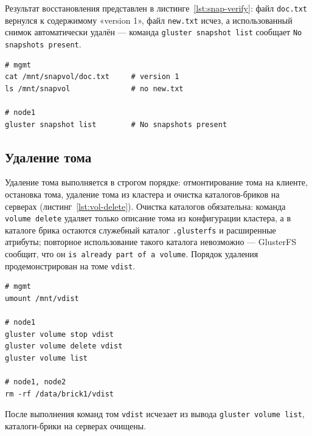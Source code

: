 Результат восстановления представлен в
листинге~\ref{lst:snap-verify}: файл \texttt{doc.txt} вернулся
к содержимому «version 1», файл \texttt{new.txt} исчез,
а использованный снимок автоматически удалён --- команда
\texttt{gluster snapshot list} сообщает \texttt{No snapshots
present}.

\begin{lstlisting}[caption={Проверка результата восстановления (mgmt, node1)}, label={lst:snap-verify}]
# mgmt
cat /mnt/snapvol/doc.txt     # version 1
ls /mnt/snapvol              # no new.txt 

# node1
gluster snapshot list        # No snapshots present
\end{lstlisting}

\subsection{Удаление тома}

Удаление тома выполняется в строгом порядке: отмонтирование тома
на клиенте, остановка тома, удаление тома из кластера и очистка
каталогов-бриков на серверах (листинг~\ref{lst:vol-delete}).
Очистка каталогов обязательна: команда \texttt{volume delete}
удаляет только описание тома из конфигурации кластера, а в каталоге
брика остаются служебный каталог \texttt{.glusterfs} и расширенные
атрибуты; повторное использование такого каталога невозможно ---
GlusterFS сообщит, что он \texttt{is already part of a volume}.
Порядок удаления продемонстрирован на томе \texttt{vdist}.

\begin{lstlisting}[caption={Удаление тома vdist (mgmt, node1, node1 и node2)}, label={lst:vol-delete}]
# mgmt
umount /mnt/vdist

# node1
gluster volume stop vdist
gluster volume delete vdist
gluster volume list

# node1, node2
rm -rf /data/brick1/vdist
\end{lstlisting}

После выполнения команд том \texttt{vdist} исчезает из вывода
\texttt{gluster volume list}, каталоги-брики на серверах очищены.